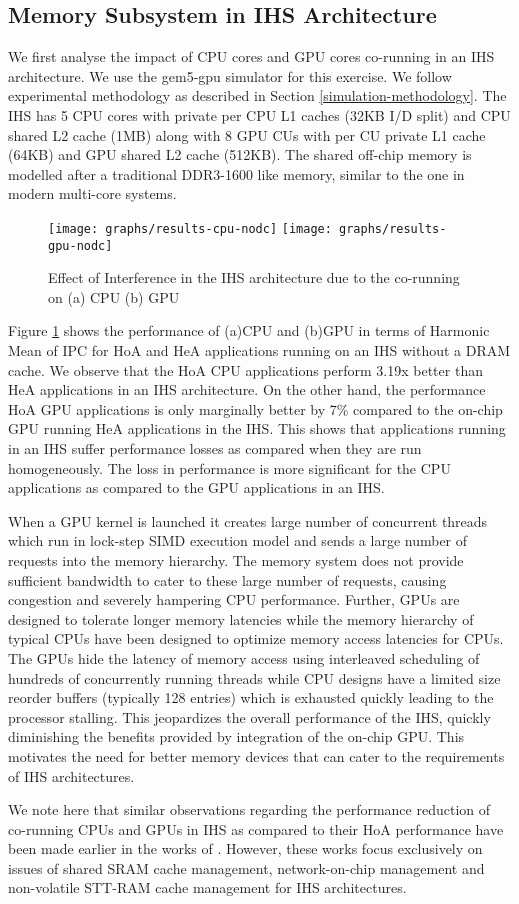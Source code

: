 \subsection{Memory Subsystem in IHS Architecture}
We first analyse the impact of CPU cores and GPU cores co-running in an IHS architecture. 
We use the gem5-gpu \cite{gem5-gpu} simulator for this exercise. We follow experimental methodology as described in Section \ref{simulation-methodology}. The IHS has 5 CPU cores with private per CPU L1 caches (32KB I/D split) and CPU shared L2 cache (1MB) along with 8 GPU CUs with per CU private L1 cache (64KB) and GPU shared L2 cache (512KB).
The shared off-chip memory is modelled after a traditional DDR3-1600 like memory, similar to the one in modern multi-core systems. 
\begin{figure}[htb]
	\centering
	\texttt{[image: graphs/results-cpu-nodc]}
	\texttt{[image: graphs/results-gpu-nodc]}
	\caption{Effect of Interference in the IHS architecture due to the co-running on (a) CPU (b) GPU}
	\label{results-interference}
\end{figure}
\par Figure \ref{results-interference} shows the performance of (a)CPU and (b)GPU in terms of Harmonic Mean of IPC for HoA and HeA applications running on an IHS without a DRAM cache. We observe that the HoA CPU applications perform 3.19x better than HeA applications in an IHS architecture. On the other hand, the performance HoA GPU applications is only marginally better by 7\% compared to the on-chip GPU running HeA applications in the IHS. This shows that applications running in an IHS suffer performance losses as compared when they are run homogeneously. The loss in performance is more significant for the CPU applications as compared to the GPU applications in an IHS. 
\par When a GPU kernel is launched it creates large number of concurrent threads which run in lock-step SIMD execution model and sends a large number of requests into the memory hierarchy. The memory system does not provide sufficient bandwidth to cater to these large number of requests, causing congestion and severely hampering CPU performance. Further, GPUs are designed to tolerate longer memory latencies while the memory hierarchy of typical CPUs have been designed to optimize memory access latencies for CPUs. The GPUs hide the latency of memory access using interleaved scheduling of hundreds of concurrently running threads while CPU designs have a limited size reorder buffers (typically 128 entries) which is exhausted quickly leading to the processor stalling. This jeopardizes the overall performance of the IHS, quickly diminishing the benefits provided by integration of the on-chip GPU. This motivates the need for better memory devices that can cater to the requirements of IHS architectures.
\par We note here that similar observations regarding the performance reduction of co-running CPUs and GPUs in IHS as compared to their HoA performance have been made earlier in the works of \cite{helm,oscar}. However, these works focus exclusively on issues of shared SRAM cache management, network-on-chip management and non-volatile STT-RAM cache management for IHS architectures.

